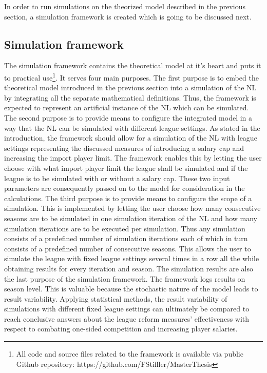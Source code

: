 \documentclass[12pt, a4paper]{article}
\begin{document}
In order to run simulations on the theorized model described in the previous section, a simulation framework is created which is going to be discussed next. 

\subsection{Simulation framework}
\label{simulationFramework}

The simulation framework contains the theoretical model at it's heart and puts it to practical use\footnote{All code and source files related to the framework is available via public Github repository: https://github.com/FStiffler/MasterThesis}. It serves four main purposes. The first purpose is to embed the theoretical model introduced in the previous section into a simulation of the NL by integrating all the separate mathematical definitions. Thus, the framework is expected to represent an artificial instance of the NL which can be simulated. The second purpose is to provide means to configure the integrated model in a way that the NL can be simulated with different league settings. As stated in the introduction, the framework should allow for a simulation of the NL with league settings representing the discussed measures of introducing a salary cap and increasing the import player limit. The framework enables this by letting the user choose with what import player limit the league shall be simulated and if the league is to be simulated with or without a salary cap. These two input parameters are consequently passed on to the model for consideration in the calculations. The third purpose is to provide means to configure the scope of a simulation. This is implemented by letting the user choose how many consecutive seasons are to be simulated in one simulation iteration of the NL and how many simulation iterations are to be executed per simulation. Thus any simulation consists of a predefined number of simulation iterations each of which in turn consists of a predefined number of consecutive seasons. This allows the user to simulate the league with fixed league settings several times in a row all the while obtaining results for every iteration and season. The simulation results are also the last purpose of the simulation framework. The framework logs results on season level. This is valuable because the stochastic nature of the model leads to result variability. Applying statistical methods, the result variability of simulations with different fixed league settings can ultimately be compared to reach conclusive answers about the league reform measures' effectiveness with respect to combating one-sided competition and increasing player salaries. 
\end{document}
